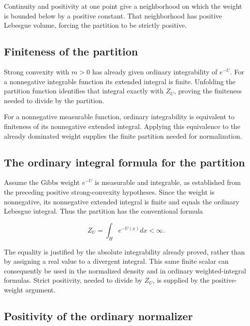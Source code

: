 \documentclass[11pt,a4paper]{report}
\begin{document}
Continuity and positivity at one point give a neighborhood on which the weight is bounded below by a positive constant. That neighborhood has positive Lebesgue volume, forcing the partition to be strictly positive.

\subsection{\texorpdfstring{Finiteness of the partition}{Finiteness of the partition}}
\label{report-step-UnadjustedLangevin-Gibbs-lean-10}


Strong convexity with \(m>0\) has already given ordinary integrability of \(e^{-U}\). For a nonnegative integrable function its extended integral is finite. Unfolding the partition function identifies that integral exactly with \(Z_U\), proving the finiteness needed to divide by the partition.



For a nonnegative measurable function, ordinary integrability is equivalent to finiteness of its nonnegative extended integral. Applying this equivalence to the already dominated weight supplies the finite partition needed for normalization.

\subsection{\texorpdfstring{The ordinary integral formula for the partition}{The ordinary integral formula for the partition}}
\label{report-step-UnadjustedLangevin-Gibbs-lean-11}


Assume the Gibbs weight \(e^{-U}\) is measurable and integrable, as established from the preceding positive strong-convexity hypotheses. Since the weight is nonnegative, its nonnegative extended integral is finite and equals the ordinary Lebesgue integral. Thus the partition has the conventional formula

\[Z_U=\int_H e^{-U(x)}dx<\infty.\]


The equality is justified by the absolute integrability already proved, rather than by assigning a real value to a divergent integral. This same finite scalar can consequently be used in the normalized density and in ordinary weighted-integral formulas. Strict positivity, needed to divide by \(Z_U\), is supplied by the positive-weight argument.

\subsection{\texorpdfstring{Positivity of the ordinary normalizer}{Positivity of the ordinary normalizer}}
\label{report-step-UnadjustedLangevin-Gibbs-lean-12}
\end{document}
